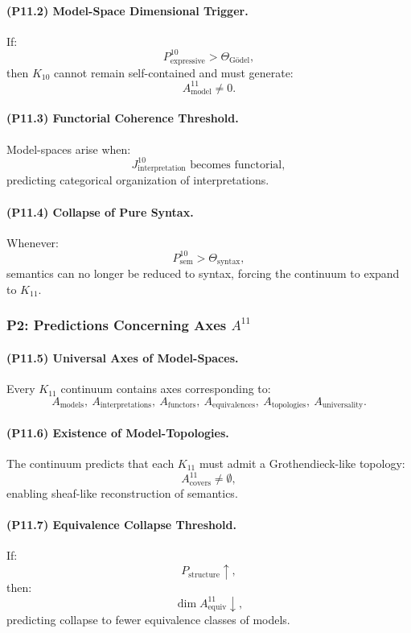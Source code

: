 \paragraph{(P11.2) Model-Space Dimensional Trigger.}
If:
\[
P_{\mathrm{expressive}}^{10} > \Theta_{\mathrm{Gödel}},
\]
then $K_{10}$ cannot remain self-contained and must generate:
\[
A_{\mathrm{model}}^{11} \neq 0.
\]

\paragraph{(P11.3) Functorial Coherence Threshold.}
Model-spaces arise when:
\[
J_{\mathrm{interpretation}}^{10} 
\text{ becomes functorial},
\]
predicting categorical organization of interpretations.

\paragraph{(P11.4) Collapse of Pure Syntax.}
Whenever:
\[
P_{\mathrm{sem}}^{10} > \Theta_{\mathrm{syntax}},
\]
semantics can no longer be reduced to syntax,  
forcing the continuum to expand to $K_{11}$.

\subsubsection{P2: Predictions Concerning Axes $A^{11}$}

\paragraph{(P11.5) Universal Axes of Model-Spaces.}
Every $K_{11}$ continuum contains axes corresponding to:
\[
A_{\mathrm{models}},\
A_{\mathrm{interpretations}},\
A_{\mathrm{functors}},\
A_{\mathrm{equivalences}},\
A_{\mathrm{topologies}},\
A_{\mathrm{universality}}.
\]

\paragraph{(P11.6) Existence of Model-Topologies.}
The continuum predicts that each $K_{11}$ must admit a 
Grothendieck-like topology:
\[
A_{\mathrm{covers}}^{11} \neq \emptyset,
\]
enabling sheaf-like reconstruction of semantics.

\paragraph{(P11.7) Equivalence Collapse Threshold.}
If:
\[
P_{\mathrm{structure}} \uparrow,
\]
then:
\[
\dim A_{\mathrm{equiv}}^{11} \downarrow,
\]
predicting collapse to fewer equivalence classes of models.

